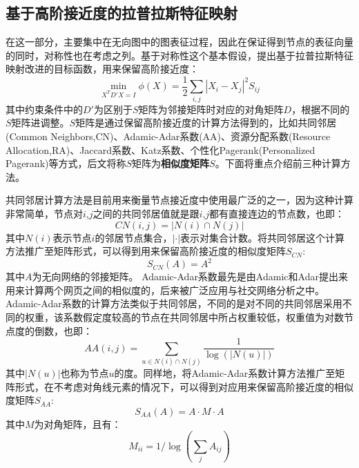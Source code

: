 \subsection{基于高阶接近度的拉普拉斯特征映射}
在这一部分，主要集中在无向图中的图表征过程，因此在保证得到节点的表征向量的同时，对称性也在考虑之列。基于对称性这个基本假设，提出基于拉普拉斯特征映射改进的目标函数，用来保留高阶接近度：
\begin{equation}\label{high_order_condition}
	\min_{X^TD'X=I} \phi(X) = \frac{1}{2}\sum_{i,j}|X_i - X_j|^2S_{ij} 
\end{equation}
其中约束条件中的$D'$为区别于$S$矩阵为邻接矩阵时对应的对角矩阵$D$，根据不同的$S$矩阵进调整。$S$矩阵是通过保留高阶接近度的计算方法得到的，比如共同邻居(Common Neighbors,CN)\cite{newman2001clustering}、Adamic-Adar系数(AA)\cite{adamic2003friends}、资源分配系数(Resource Allocation,RA)\cite{zhou2009predicting}、Jaccard系数、Katz系数、个性化Pagerank(Personalized Pagerank)\cite{wang2015link}等方式，后文将称$S$矩阵为\textbf{相似度矩阵$S$}。下面将重点介绍前三种计算方法。

共同邻居计算方法是目前用来衡量节点接近度中使用最广泛的之一，因为这种计算非常简单，节点对$i$,$j$之间的共同邻居值就是跟$i$,$j$都有直接连边的节点数，也即：
\begin{equation}
	CN(i,j) = |N(i) \cap N(j)|
\end{equation}
其中$N(i)$表示节点$i$的邻居节点集合，$|\cdot|$表示对集合计数。将共同邻居这个计算方法推广至矩阵形式，可以得到用来保留高阶接近度的相似度矩阵$S_{CN}$:
\begin{equation}
	S_{CN}(A) = A^2
\end{equation}
其中$A$为无向网络的邻接矩阵。
Adamic-Adar系数最先是由Adamic和Adar提出来用来计算两个网页之间的相似度的，后来被广泛应用与社交网络分析之中。Adamic-Adar系数的计算方法类似于共同邻居，不同的是对不同的共同邻居采用不同的权重，该系数假定度较高的节点在共同邻居中所占权重较低，权重值为对数节点度的倒数，也即：
\begin{equation}
	AA(i,j) = \sum_{u \in N(i)\cap N(j)} \frac{1}{\log(|N(u)|)}
\end{equation}
其中$|N(u)|$也称为节点$u$的度。同样地，将Adamic-Adar系数计算方法推广至矩阵形式，在不考虑对角线元素的情况下，可以得到对应用来保留高阶接近度的相似度矩阵$S_{AA}$:
\begin{equation}
	S_{AA}(A) = A \cdot M \cdot A
\end{equation}
其中$M$为对角矩阵，且有：
\begin{equation}
M_{ii} = 1/\log(\sum_j{A_{ij}})
\end{equation}

